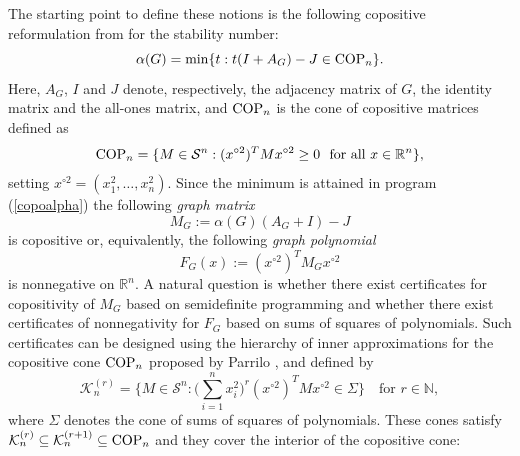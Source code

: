 \documentclass[11pt]{article}
\newcommand{\oN}{{\mathbb N}}
\newcommand{\oR}{{\mathbb R}}
\numberwithin{equation}{section}
\newcommand{\COP}{{\text{\rm COP}}}
\newcommand{\MK}{{\mathcal K}}
\begin{document}
The starting point to define these notions is the following copositive reformulation from \cite{dKP2002} for the stability number:
\begin{equation}\label{copoalpha}
\alpha(G)=\min\{t: t(I+A_G)-J \in \COP_n\}.
\end{equation}
Here, $A_G$, $I$ and $J$ denote, respectively, the adjacency matrix of $G$,  the identity matrix and  the all-ones matrix, and $\COP_n$ is the  cone of copositive matrices defined as
$$\COP_n=\{M\in \mathcal S^n: (x^{\circ 2})^TMx^{\circ 2}\ge 0\ \text{ for all } x\in \oR^n\},
$$ setting 
$x^{\circ 2}=(x_1^2,\ldots,x_n^2)$.
Since the minimum is attained in program (\ref{copoalpha})   the following {\em graph matrix }
\begin{equation}\label{graph-matrix}
M_G:=\alpha(G)(A_G+I)-J
\end{equation}
is copositive or, 
 equivalently,  the following {\em graph polynomial }
\begin{equation}\label{graph-pol}
F_G(x):=(x^{\circ2})^TM_Gx^{\circ2}
\end{equation}
is nonnegative on $ \mathbb{R}^n$. 
A natural question is whether there exist certificates for copositivity of $M_G$ based on semidefinite programming and whether there exist certificates of nonnegativity for $F_G$ based on sums of squares of polynomials. 
Such certificates can be designed using the hierarchy of inner approximations for the copositive cone $\COP_n$ proposed by Parrilo \cite{Parrilo-thesis-2000}, and defined by
\begin{equation}\label{coneKr}
\MK_n^{(r)}=\{M \in \mathcal S^n:  \big(\sum_{i=1}^nx_i^2\big)^r (x^{\circ2})^TMx^{\circ 2} \in \Sigma\}\quad \text {for } r\in \oN,
\end{equation}
 where $\Sigma$ denotes the cone of sums of squares of polynomials.
These cones satisfy %
$\MK_n^{(r)}\subseteq \MK_n^{(r+1)}\subseteq \COP_n$ and they cover the interior of the copositive cone:
\end{document}

